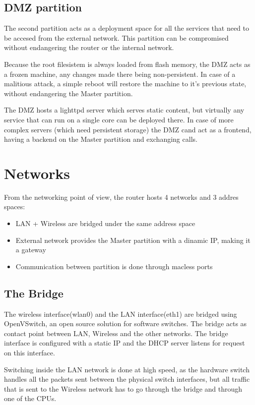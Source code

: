 \subsection{DMZ partition}
The second partition acts as a deployment space for all the services that need
to be accesed from the external network. This partition can be compromised
without endangering the router or the internal network.

Because the root filesistem is always loaded from flash memory, the DMZ
acts as a frozen machine, any changes made there being non-persistent.
In case of a malitious attack, a simple reboot will restore the machine to
it's previous state, without endangering the Master partition.

The DMZ hosts a lighttpd server which serves static content, but virtually
any service that can run on a single core can be deployed there.
In case of more complex servers (which need persistent storage) the DMZ
cand act as a frontend, having a backend on the Master partition and exchanging
calls.

\section{Networks}
\label{sec:networks}

From the networking point of view, the router hosts 4 networks and 3 addres spaces:
\begin{itemize}
	\item LAN + Wireless are bridged under the same address space
	\item External network provides the Master partition with a dinamic IP, making
	it a gateway
	\item Communication between partition is done through macless ports
\end{itemize}

\subsection{The Bridge}
The wireless interface(wlan0) and the LAN interface(eth1) are bridged using
OpenVSwitch, an open source solution for software switches. The bridge
acts as contact point between LAN, Wireless and the other networks.
The bridge interface is configured with a static IP and the DHCP server
listens for request on this interface.

Switching inside the LAN network is done at high speed, as the hardware switch
handles all the packets sent between the physical switch interfaces, but all
traffic that is sent to the Wireless network has to go through the bridge and
through one of the CPUs.

